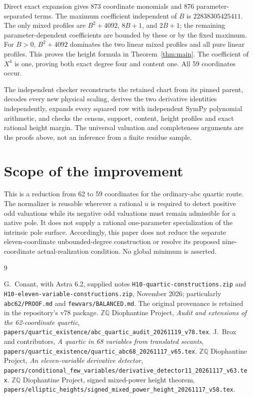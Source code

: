 \documentclass[11pt,a4paper]{article}
\newcommand{\Q}{\mathbb Q}\newcommand{\Z}{\mathbb Z}
\begin{document}
Direct exact expansion gives 873 coordinate monomials and 876
parameter-separated terms. The maximum coefficient independent of $B$
is $22838305425411$. The only mixed profiles are
$B^2+4092$, $8B+1$, and $2B+1$; the remaining parameter-dependent
coefficients are bounded by these or by the fixed maximum. For $B>0$,
$B^2+4092$ dominates the two linear mixed profiles and all pure linear
profiles. This proves the height formula in Theorem~\ref{thm:main}.
The coefficient of $X^4$ is one, proving both exact degree four and
content one. All 59 coordinates occur.

The independent checker reconstructs the retained chart from its pinned
parent, decodes every new physical scaling, derives the two derivative
identities independently, expands every squared row with independent
SymPy polynomial arithmetic, and checks the census, support, content,
height profiles and exact rational height margin. The universal
valuation and completeness arguments are the proofs above, not an
inference from a finite residue sample.

\section{Scope of the improvement}

This is a reduction from 62 to 59 coordinates for the ordinary-abc
quartic route. The normalizer is reusable wherever a rational $u$ is
required to detect positive odd valuations while its negative odd
valuations must remain admissible for a native pole. It does not supply
a rational one-parameter specialization of the intrinsic pole surface.
Accordingly, this paper does not reduce the separate eleven-coordinate
unbounded-degree construction or resolve its proposed nine-coordinate
actual-realization condition. No global minimum is asserted.

\begin{thebibliography}{9}\small\raggedright
{} G.~Conant, with Astra 6.2,
supplied notes \texttt{H10-quartic-constructions.zip} and
\texttt{H10-eleven-variable-constructions.zip}, November 2026;
particularly \texttt{abc62/PROOF.md} and \texttt{fewvars/BALANCED.md}.
The original provenance is retained in the repository's v78 package.
 \(\Z\Q\) Diophantine Project,
\emph{Audit and extensions of the 62-coordinate quartic},
\nolinkurl{papers/quartic_existence/abc_quartic_audit_20261119_v78.tex}.
 J.~Brox and contributors,
\emph{A quartic in 68 variables from translated secants},
\nolinkurl{papers/quartic_existence/quartic_abc68_20261117_v65.tex}.
 \(\Z\Q\) Diophantine Project,
\emph{An eleven-variable derivative detector},
\nolinkurl{papers/conditional_few_variables/derivative_detector11_20261117_v63.tex}.
 \(\Z\Q\) Diophantine Project, signed mixed-power height theorem,
\nolinkurl{papers/elliptic_heights/signed_mixed_power_height_20261117_v58.tex}.
\end{thebibliography}
\end{document}
